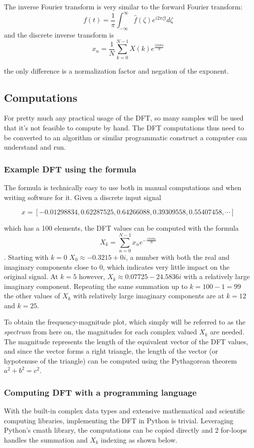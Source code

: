 The inverse Fourier transform is very similar to the forward Fourier transform:
$$ f(t) = \frac{1}{\pi}\int_{-\infty}^{\infty} \hat{f}(\zeta)e^{i2\pi\zeta t} d\zeta$$
and the discrete inverse transform is 
$$ x_n = \frac{1}{N}\sum_{k=0}^{N-1} X(k)e^{\frac{i2\pi kn}{N}}$$

the only difference is a normalization factor and negation of the exponent.

\subsection{Computations}
For pretty much any practical usage of the DFT, so many samples will be used that it's not feasible to compute by hand. The DFT computations thus need to be converted to an algorithm or similar programmatic construct a computer can understand and run.

\subsubsection{Example DFT using the formula}
The formula is technically easy to use both in manual computations and when writing software for it. Given a discrete input signal 

$$x = [-0.01298834,  0.62287525,  0.64266088,  0.39309558,  0.55407458, \cdots]$$

which has a 100 elements, the DFT values can be computed with the formula $$X_k = \sum_{n=0}^{N-1} x_ne^{-\frac{i2\pi kn}{N}}$$. Starting with $k=0$ $X_0 \approx -0.3215+0i$, a number with both the real and imaginary components close to 0, which indicates very little impact on the original signal. At $k=5$ however, $X_k \approx 0.07725-24.5836i$ with a relatively large imaginary component. Repeating the same summation up to $k=100-1 = 99$ the other values of $X_k$ with relatively large imaginary components are at $k=12$ and $k=25$. 

To obtain the frequency-magnitude plot, which simply will be referred to as the \textit{spectrum} from here on, the magnitudes for each complex valued $X_k$ are needed. The magnitude represents the length of the equivalent vector of the DFT values, and since the vector forms a right triangle, the length of the vector (or hypotenuse of the triangle) can be computed using the Pythagorean theorem $a^2 + b^2 = c^2$. 


\subsubsection{Computing DFT with a programming language}
With the built-in complex data types and extensive mathematical and scientific computing libraries, implementing the DFT in Python is trivial. Leveraging Python's cmath library, the computations can be copied directly and 2 for-loops handles the summation and $X_k$ indexing as shown below.

